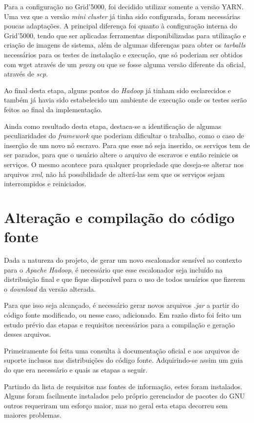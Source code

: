Para a configuração no Grid'5000, foi decidido utilizar somente a versão YARN. Uma vez que a versão \emph{mini cluster} já tinha sido configurada, foram necessárias poucas adaptações. A principal diferença foi quanto à configuração interna do Grid'5000, tendo que ser aplicadas ferramentas disponibilizadas para utilização e criação de imagens de sistema, além de algumas diferenças para obter os \emph{tarballs} necessários para os testes de instalação e execução, que só poderiam ser obtidos com wget através de um \emph{proxy} ou que se fosse alguma versão diferente da oficial, através de \emph{scp}.

Ao final desta etapa, alguns pontos do \emph{Hadoop} já tinham sido esclarecidos e também já havia sido estabelecido um ambiente de execução onde os testes serão feitos ao final da implementação. 

Ainda como resultado desta etapa, destaca-se a identificação de algumas peculiaridades do \emph{framework} que poderiam dificultar o trabalho, como o caso de inserção de um novo nó escravo. Para que esse nó seja inserido, os serviços tem de ser parados, para que o usuário altere o arquivo de escravos e então reinicie os serviços. O mesmo acontece para qualquer propriedade que deseja-se alterar nos arquivos \emph{xml}, não há possibilidade de alterá-las sem que os serviços sejam interrompidos e reiniciados.

\section{Alteração e compilação do código fonte}
Dada a natureza do projeto, de gerar um novo escalonador sensível ao contexto para o \emph{Apache Hadoop}, é necessário que esse escalonador seja incluído na distribuição final e que fique disponível para o uso de todos usuários que fizerem o \emph{download} da versão alterada.

Para que isso seja alcançado, é necessário gerar novos arquivos \emph{.jar} a partir do código fonte modificado, ou nesse caso, adicionado. Em razão disto foi feito um estudo prévio das etapas e requisitos necessários para a compilação e geração desses arquivos.

Primeiramente foi feita uma consulta à documentação oficial e aos arquivos de suporte inclusos nas distribuições do código fonte. Adquirindo-se assim um guia do que era necessário e quais as etapas a seguir.

Partindo da lista de requisitos nas fontes de informação, estes foram instalados. Alguns foram facilmente instalados pelo próprio gerenciador de pacotes do GNU outros requeriram um esforço maior, mas no geral esta etapa decorreu sem maiores problemas.


